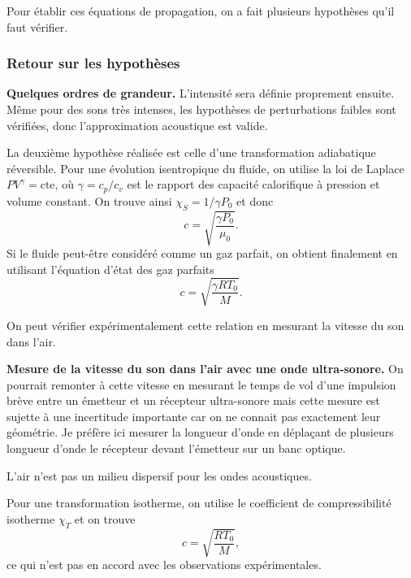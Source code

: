 \begin{transition}
Pour établir ces équations de propagation, on a fait plusieurs hypothèses qu'il faut vérifier.
\end{transition}

\subsubsection{Retour sur les hypothèses}

\begin{slide}
\textbf{Quelques ordres de grandeur.}
L'intensité sera définie proprement ensuite.
Même pour des sons très intenses, les hypothèses de perturbations faibles sont vérifiées, donc l'approximation acoustique est valide.
\end{slide}

La deuxième hypothèse réalisée est celle d'une transformation adiabatique réversible.
Pour une évolution isentropique du fluide, on utilise la loi de Laplace $PV^\gamma = \mathrm{cte}$, où $\gamma=c_p/c_v$ est le rapport des capacité calorifique à pression et volume constant.
On trouve ainsi $\chi_S = 1/\gamma P_0$ et donc
\begin{equation*}
c = \sqrt{\frac{\gamma P_0}{\mu_0}}.
\end{equation*}
Si le fluide peut-être considéré comme un gaz parfait, on obtient finalement en utilisant l'équation d'état des gaz parfaits
\begin{equation}
c = \sqrt{\frac{\gamma RT_0}{M}}.
\end{equation}

On peut vérifier expérimentalement cette relation en mesurant la vitesse du son dans l'air.
\begin{experience}
\textbf{Mesure de la vitesse du son dans l'air avec une onde ultra-sonore.}
On pourrait remonter à cette vitesse en mesurant le temps de vol d'une impulsion brève entre un émetteur et un récepteur ultra-sonore mais cette mesure est sujette à une incertitude importante car on ne connait pas exactement leur géométrie.
Je préfère ici mesurer la longueur d'onde en déplaçant de plusieurs longueur d'onde le récepteur devant l'émetteur sur un banc optique.

L'air n'est pas un milieu dispersif pour les ondes acoustiques.
\end{experience}

\begin{remarque}
Pour une transformation isotherme, on utilise le coefficient de compressibilité isotherme $\chi_T$ et on trouve
\begin{equation*}
c = \sqrt{\frac{RT_0}{M}},
\end{equation*}
ce qui n'est pas en accord avec les observations expérimentales.
\end{remarque}

